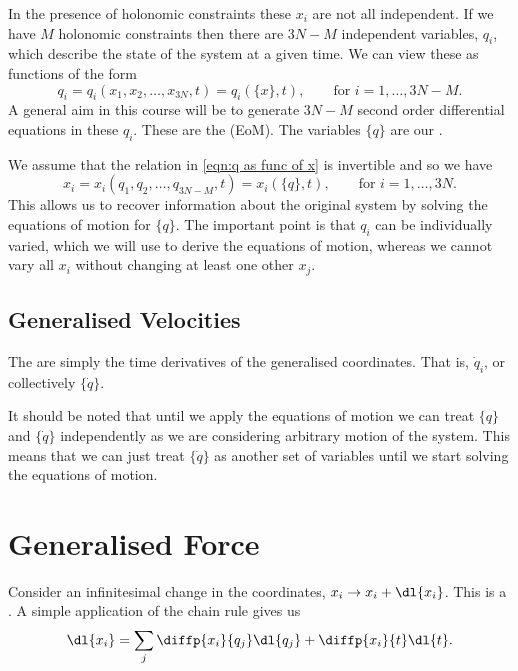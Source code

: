\documentclass[fleqn]{NotesClass}
\begin{document}
    In the presence of holonomic constraints these \(x_i\) are not all independent.
    If we have \(M\) holonomic constraints then there are \(3N - M\) independent variables, \(q_i\), which describe the state of the system at a given time.
    We can view these as functions of the form
    \begin{equation}\label{eqn:q as func of x}
        q_i = q_i(x_1, x_2, \dotsc, x_{3N}, t) = q_i(\{x\}, t), \qquad\text{for } i = 1, \dotsc, 3N - M.
    \end{equation}
    A general aim in this course will be to generate \(3N - M\) second order differential equations in these \(q_i\).
    These are the  (EoM).
    The variables \(\{q\}\) are our .
    
    We assume that the relation in \cref{eqn:q as func of x} is invertible and so we have
    \begin{equation}
        x_i = x_i(q_1, q_2, \dotsc, q_{3N-M}, t) = x_i(\{q\}, t), \qquad\text{for } i = 1, \dotsc, 3N.
    \end{equation}
    This allows us to recover information about the original system by solving the equations of motion for \(\{q\}\).
    The important point is that \(q_i\) can be individually varied, which we will use to derive the equations of motion, whereas we cannot vary all \(x_i\) without changing at least one other \(x_j\).
    
    \subsection{Generalised Velocities}
    The  are simply the time derivatives of the generalised coordinates.
    That is, \(\dot{q}_i\), or collectively \(\{\dot{q}\}\).
    
    It should be noted that until we apply the equations of motion we can treat \(\{q\}\) and \(\{\dot{q}\}\) independently as we are considering arbitrary motion of the system.
    This means that we can just treat \(\{\dot{q}\}\) as another set of variables until we start solving the equations of motion.
    
    \section{Generalised Force}
    Consider an infinitesimal change in the coordinates, \(x_i \to x_i + \dl{x_i}\).
    This is a .
    A simple application of the chain rule gives us
    \begin{equation}
        \dl{x_i} = \sum_j \diffp{x_i}{q_j}\dl{q_j} + \diffp{x_i}{t}\dl{t}.
    \end{equation}
    
\end{document}
